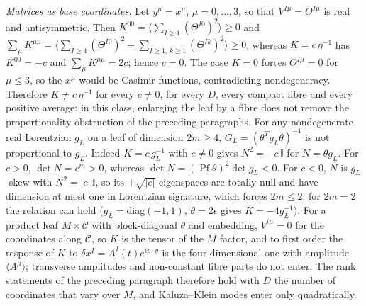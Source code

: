 \emph{Matrices as base coordinates.} Let \(y^\mu=x^\mu\), \(\mu=0,\dots,3\), so that \(V^{I\mu}=\Theta^{I\mu}\) is real and antisymmetric. Then \(K^{00}=\langle\sum_{I\ge1}(\Theta^{I0})^2\rangle\ge0\) and \(\sum_\mu K^{\mu\mu}=\langle\sum_{I\ge4}(\Theta^{I0})^2+\sum_{I\ge1,\,k\ge1}(\Theta^{Ik})^2\rangle\ge0\), whereas \(K=c\,\eta^{-1}\) has \(K^{00}=-c\) and \(\sum_\mu K^{\mu\mu}=2c\); hence \(c=0\). The case \(K=0\) forces \(\Theta^{I\mu}=0\) for \(\mu\le3\), so the \(x^\mu\) would be Casimir functions, contradicting nondegeneracy. Therefore \(K\ne c\,\eta^{-1}\) for every \(c\ne0\), for every \(D\), every compact fibre and every positive average: in this class, enlarging the leaf by a fibre does not remove the proportionality obstruction of the preceding paragraphs. For any nondegenerate real Lorentzian \(g_L\) on a leaf of dimension \(2m\ge4\), \(G_L=(\theta^{T}g_L\theta)^{-1}\) is not proportional to \(g_L\). Indeed \(K=c\,g_L^{-1}\) with \(c\neq0\) gives \(N^2=-c\,\mathbb I\) for \(N=\theta g_L\). For \(c>0\), \(\det N=c^m>0\), whereas \(\det N=(\operatorname{Pf}\theta)^2\det g_L<0\). For \(c<0\), \(N\) is \(g_L\)-skew with \(N^2=|c|\,\mathbb I\), so its \(\pm\sqrt{|c|}\) eigenspaces are totally null and have dimension at most one in Lorentzian signature, which forces \(2m\le2\); for \(2m=2\) the relation can hold (\(g_L=\mathrm{diag}(-1,1)\), \(\theta=2\epsilon\) gives \(K=-4g_L^{-1}\)). For a product leaf \(M\times\mathcal C\) with block-diagonal \(\theta\) and embedding, \(V^{i\mu}=0\) for the coordinates along \(\mathcal C\), so \(K\) is the tensor of the \(M\) factor, and to first order the response of \(K\) to \(\delta x^I=A^I(t)e^{ip\cdot y}\) is the four-dimensional one with amplitude \(\langle A^\mu\rangle\); transverse amplitudes and non-constant fibre parts do not enter. The rank statements of the preceding paragraph therefore hold with \(D\) the number of coordinates that vary over \(M\), and Kaluza--Klein modes enter only quadratically.

